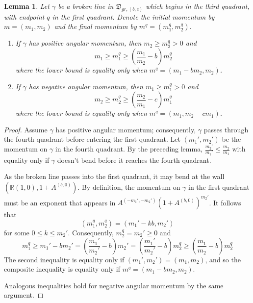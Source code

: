\documentclass[11pt]{amsart}
\newtheorem{lemma}{Lemma}[section]
\theoremstyle{remark}
\numberwithin{equation}{section}
\begin{document}
\begin{lemma}
Let $\gamma$ be a broken line in $\mathfrak{D}_{gr,(b,c)}$ which begins in the third quadrant, with endpoint $q$ in the first quadrant.  Denote the  initial momentum by $m=(m_1,m_2)$ and the final momentum by $m^q=(m_1^q,m_2^q)$.  
\begin{enumerate}
	\item If $\gamma$ has positive angular momentum, then $m_2\geq m_2^q>0$ and
	\[ m_1\geq m_1^q\geq\left( \frac{m_1}{m_2}-b\right)m_2^q\]
	where the lower bound is equality only when $m^q =( m_1-bm_2,m_2)$.
	\item If $\gamma$ has negative angular momentum, then $m_1\geq  m_1^q>0$ and
	\[ m_2 \geq m_2^q\geq\left( \frac{m_2}{m_1}-c\right)m_1^q\]
	where the lower bound is equality only when $m^q =( m_1,m_2-cm_1)$.
\end{enumerate}
\end{lemma}
\begin{proof}
Assume $\gamma$ has positive angular momentum; consequently, $\gamma$ passes through the fourth quadrant before entering the first quadrant.  Let $(m_1',m_2')$ be the momentum on $\gamma$ in the fourth quadrant.  By the preceding lemma, $\frac{m_2'}{m_1'}\leq \frac{m_2}{m_1}$ with equality only if $\gamma$ doesn't bend before it reaches the fourth quadrant.  

As the broken line passes into the first quadrant, it may bend at the wall $(\mathbb{R}(1,0),1+A^{(b,0)})$.  By definition, the momentum on $\gamma$ in the first quadrant must be an exponent that appears in $A^{(-m_1',-m_2')}(1+A^{(b,0)})^{m_2'}$.  It follows that%
\[ (m_1^q,m_2^q) = (m_1'-kb,m_2')\]
for some $0\leq k\leq m_2'$.
Consequently, $m_2^q=m_2'\geq0$ and 
\[ m_1^q\geq m_1' - bm_2' = \left(\frac{m_1'}{m_2'} - b\right) m_2'  = \left(\frac{m_1'}{m_2'} - b\right) m_2^q \geq \left(\frac{m_1}{m_2} - b\right) m_2^q\]
The second inequality is equality only if $(m_1',m_2')=(m_1,m_2)$, and so the composite inequality is equality only if $m^q =( m_1-bm_2,m_2)$.

Analogous inequalities hold for negative angular momentum by the same argument.
\end{proof}
\end{document}
